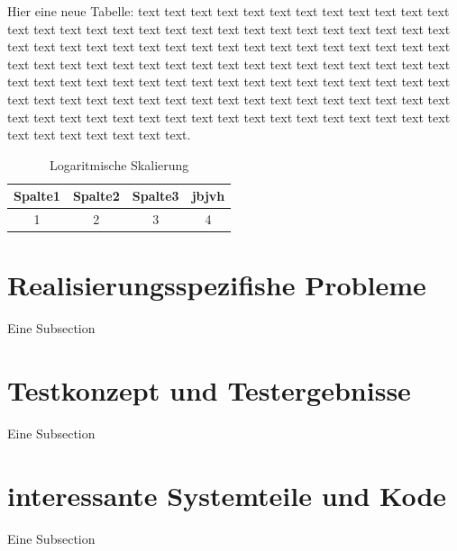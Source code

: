Hier eine neue Tabelle: text text text text text text text text text text text text text text text text text text text text text text text text text text text text text text text text text text text text text text text text text text text text text text text text text text text text text text text text text text text text text text text text text text text text text text text text text text text text text text text text text text text text text text text text text text text text text text text text text text text text text text text text text text text text text text text text text text text text text text text text text.   
            
            \begin{table}[h]
                \begin{tabular}{cccc}
                      \hline
                      Spalte1 & Spalte2 & Spalte3 & jbjvh\\                      
                      \hline
                      1 & 2 & 3 & 4\\
                      \hline
                \end{tabular}
                \centering
                \caption{Logaritmische Skalierung}
                \label{Tab:Logaritmische Skalierung}
            \end{table}
 
        
        
    \section{Realisierungsspezifishe Probleme}
        Eine Subsection
	\section{Testkonzept und Testergebnisse}
        Eine Subsection
	\section{interessante Systemteile und Kode}
        Eine Subsection
  